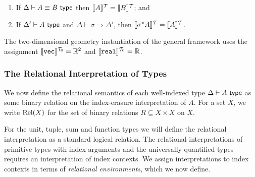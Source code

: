 \begin{lemma}\label{lem:tyeqsubst-erasure}
  \begin{enumerate}
  \item If $\Delta \vdash A \equiv B \textsf{ type}$ then $\llbracket A \rrbracket^{\mathcal{T}} =
    \llbracket B \rrbracket^{\mathcal{T}}$; and
  \item If $\Delta' \vdash A \textsf{ type}$ and $\Delta \vdash \sigma
    \Rightarrow \Delta'$, then $\llbracket \sigma^*A \rrbracket^{\mathcal{T}} = \llbracket A \rrbracket^{\mathcal{T}}$.
  \end{enumerate}
\end{lemma}

\begin{example}
  The two-dimensional geometry instantiation of the general framework
  uses the assignment $\llbracket \texttt{vec} \rrbracket^{\mathcal{T}_0} = \mathbb{R}^2$ and
  $\llbracket \texttt{real} \rrbracket^{\mathcal{T}_0} = \mathbb{R}$.
\end{example}


\subsubsection{The Relational Interpretation of Types}
\label{sec:relational-semantics}

We now define the relational semantics of each well-indexed type
$\Delta \vdash A \textsf{ type}$ as some binary relation on the index-erasure
interpretation of $A$. For a set $X$, we write $\mathrm{Rel}(X)$ for the set
of binary relations $R \subseteq X \times X$ on $X$.

For the unit, tuple, sum and function types we will define the
relational interpretation as a standard logical relation. The
relational interpretations of primitive types with index arguments and
the universally quantified types requires an interpretation of index
contexts. We assign interpretations to index contexts in terms of
\emph{relational environments}, which we now define.

